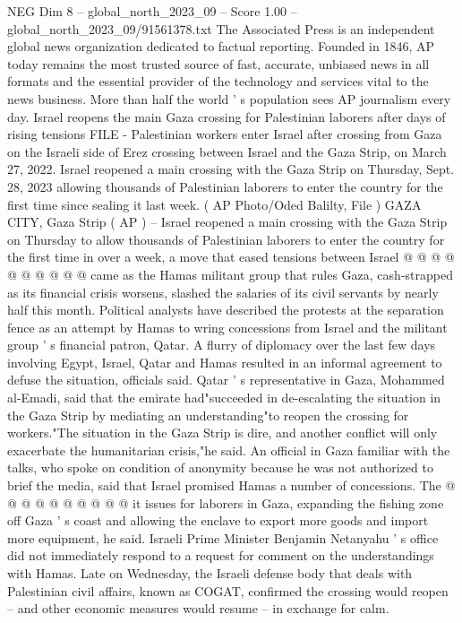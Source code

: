 \begin{textsample}{NEG Dim 8 – global\_north\_2023\_09 – Score 1.00 – global\_north\_2023\_09/91561378.txt}  \label{ex:f8_neg_319}
The Associated Press is an independent global news organization dedicated to factual reporting.
Founded in 1846, AP today remains the most trusted source of fast, accurate, unbiased news in all formats and the essential provider of the technology and services vital to the news business.
More than half the world ' s population sees AP journalism every day.
Israel reopens the main Gaza crossing for Palestinian laborers after days of rising tensions FILE - Palestinian workers enter Israel after crossing from Gaza on the Israeli side of Erez crossing between Israel and the Gaza Strip, on March 27, 2022.
Israel reopened a main crossing with the Gaza Strip on Thursday, Sept. 28, 2023 allowing thousands of Palestinian laborers to enter the country for the first time since sealing it last week. ( AP Photo/Oded Balilty, File ) GAZA CITY, Gaza Strip ( AP ) -- Israel reopened a main crossing with the Gaza Strip on Thursday to allow thousands of Palestinian laborers to enter the country for the first time in over a week, a move that eased tensions between Israel @ @ @ @ @ @ @ @ @ @ came as the Hamas militant group that rules Gaza, cash-strapped as its financial crisis worsens, slashed the salaries of its civil servants by nearly half this month.
Political analysts have described the protests at the separation fence as an attempt by Hamas to wring concessions from Israel and the militant group ' s financial patron, Qatar.
A flurry of diplomacy over the last few days involving Egypt, Israel, Qatar and Hamas resulted in an informal agreement to defuse the situation, officials said.
Qatar ' s representative in Gaza, Mohammed al-Emadi, said that the emirate had"succeeded in de-escalating the situation in the Gaza Strip by mediating an understanding"to reopen the crossing for workers."The situation in the Gaza Strip is dire, and another conflict will only exacerbate the humanitarian crisis,"he said.
An official in Gaza familiar with the talks, who spoke on condition of anonymity because he was not authorized to brief the media, said that Israel promised Hamas a number of concessions.
The @ @ @ @ @ @ @ @ @ @ it issues for laborers in Gaza, expanding the fishing zone off Gaza ' s coast and allowing the enclave to export more goods and import more equipment, he said.
Israeli Prime Minister Benjamin Netanyahu ' s office did not immediately respond to a request for comment on the understandings with Hamas.
Late on Wednesday, the Israeli defense body that deals with Palestinian civil affairs, known as COGAT, confirmed the crossing would reopen -- and other economic measures would resume -- in exchange for calm.

\end{textsample}
